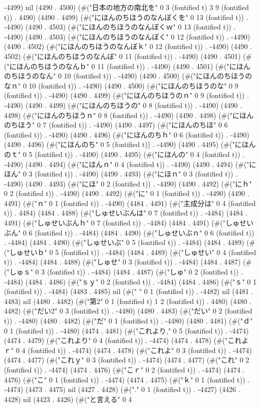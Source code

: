 -4499) nil (4490 . 4500) (#("日本の地方の南北を" 0 3 (fontified t) 3 9 (fontified t)) . 4490) (4490 . 4499) (#("にほんのちほうのなんぼくを" 0 13 (fontified t)) . -4490) (4490 . 4503) (#("にほんのちほうのなんぼくｗ" 0 13 (fontified t)) . -4490) (4490 . 4503) (#("にほんのちほうのなんぼく" 0 12 (fontified t)) . -4490) (4490 . 4502) (#("にほんのちほうのなんぼｋ" 0 12 (fontified t)) . -4490) (4490 . 4502) (#("にほんのちほうのなんぼ" 0 11 (fontified t)) . -4490) (4490 . 4501) (#("にほんのちほうのなんｂ" 0 11 (fontified t)) . -4490) (4490 . 4501) (#("にほんのちほうのなん" 0 10 (fontified t)) . -4490) (4490 . 4500) (#("にほんのちほうのなｎ" 0 10 (fontified t)) . -4490) (4490 . 4500) (#("にほんのちほうのな" 0 9 (fontified t)) . -4490) (4490 . 4499) (#("にほんのちほうのｎ" 0 9 (fontified t)) . -4490) (4490 . 4499) (#("にほんのちほうの" 0 8 (fontified t)) . -4490) (4490 . 4498) (#("にほんのちほうｎ" 0 8 (fontified t)) . -4490) (4490 . 4498) (#("にほんのちほう" 0 7 (fontified t)) . -4490) (4490 . 4497) (#("にほんのちほ" 0 6 (fontified t)) . -4490) (4490 . 4496) (#("にほんのちｈ" 0 6 (fontified t)) . -4490) (4490 . 4496) (#("にほんのち" 0 5 (fontified t)) . -4490) (4490 . 4495) (#("にほんのｔ" 0 5 (fontified t)) . -4490) (4490 . 4495) (#("にほんの" 0 4 (fontified t)) . -4490) (4490 . 4494) (#("にほんｎ" 0 4 (fontified t)) . -4490) (4490 . 4494) (#("にほん" 0 3 (fontified t)) . -4490) (4490 . 4493) (#("にほｎ" 0 3 (fontified t)) . -4490) (4490 . 4493) (#("にほ" 0 2 (fontified t)) . -4490) (4490 . 4492) (#("にｈ" 0 2 (fontified t)) . -4490) (4490 . 4492) (#("に" 0 1 (fontified t)) . -4490) (4490 . 4491) (#("ｎ" 0 1 (fontified t)) . -4490) (4484 . 4491) (#("主成分は" 0 4 (fontified t)) . 4484) (4484 . 4488) (#("しゅせいぶんは" 0 7 (fontified t)) . -4484) (4484 . 4491) (#("しゅせいぶんｈ" 0 7 (fontified t)) . -4484) (4484 . 4491) (#("しゅせいぶん" 0 6 (fontified t)) . -4484) (4484 . 4490) (#("しゅせいぶｎ" 0 6 (fontified t)) . -4484) (4484 . 4490) (#("しゅせいぶ" 0 5 (fontified t)) . -4484) (4484 . 4489) (#("しゅせいｂ" 0 5 (fontified t)) . -4484) (4484 . 4489) (#("しゅせい" 0 4 (fontified t)) . -4484) (4484 . 4488) (#("しゅせ" 0 3 (fontified t)) . -4484) (4484 . 4487) (#("しゅｓ" 0 3 (fontified t)) . -4484) (4484 . 4487) (#("しゅ" 0 2 (fontified t)) . -4484) (4484 . 4486) (#("ｓｙ" 0 2 (fontified t)) . -4484) (4484 . 4486) (#("ｓ" 0 1 (fontified t)) . -4484) (4483 . 4485) nil (#(" " 0 1 (fontified t)) . -4482) nil (4481 . 4483) nil (4480 . 4482) (#("第2" 0 1 (fontified t) 1 2 (fontified t)) . 4480) (4480 . 4482) (#("だい2" 0 3 (fontified t)) . -4480) (4480 . 4483) (#("だい" 0 2 (fontified t)) . -4480) (4480 . 4482) (#("だ" 0 1 (fontified t)) . -4480) (4480 . 4481) (#("ｄ" 0 1 (fontified t)) . -4480) (4474 . 4481) (#("これより," 0 5 (fontified t)) . -4474) (4474 . 4479) (#("これより" 0 4 (fontified t)) . -4474) (4474 . 4478) (#("これよｒ" 0 4 (fontified t)) . -4474) (4474 . 4478) (#("これよ" 0 3 (fontified t)) . -4474) (4474 . 4477) (#("これｙ" 0 3 (fontified t)) . -4474) (4474 . 4477) (#("これ" 0 2 (fontified t)) . -4474) (4474 . 4476) (#("こｒ" 0 2 (fontified t)) . -4474) (4474 . 4476) (#("こ" 0 1 (fontified t)) . -4474) (4474 . 4475) (#("ｋ" 0 1 (fontified t)) . -4474) (4473 . 4475) nil (4427 . 4428) (#("." 0 1 (fontified t)) . -4427) (4426 . 4428) nil (4423 . 4426) (#("と言える" 0 4 